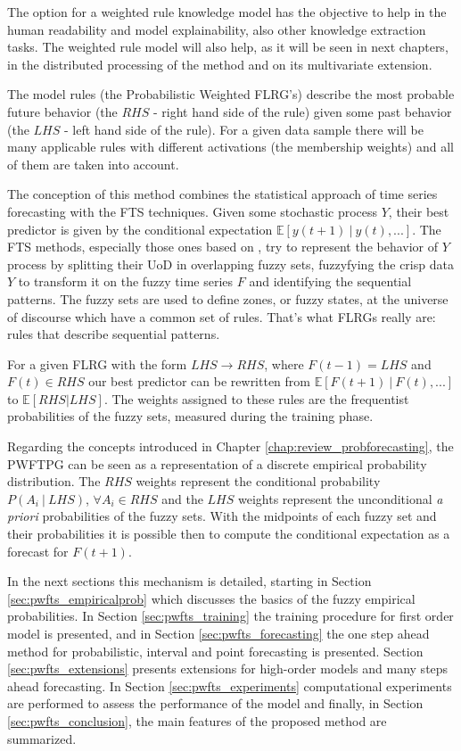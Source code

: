 The option for a weighted rule knowledge model has the objective to help in the human readability and model explainability, also other knowledge extraction tasks. The weighted rule model will also help, as it will be seen in next chapters, in the distributed processing of the method and on its multivariate extension.


The model rules (the Probabilistic Weighted FLRG's) describe the most probable future behavior (the $RHS$ - right hand side of the rule) given some past behavior (the $LHS$ - left hand side of the rule). For a given data sample there will be  many applicable rules with different activations (the membership weights) and all of them are taken into account.

The conception of this method combines the statistical approach of time series forecasting with the FTS techniques. Given some stochastic process $Y$, their best predictor is given by the conditional expectation $\mathbb{E}[y(t+1)\ |\ y(t),...]$. The FTS methods, especially those ones based on \cite{chen1996forecasting}, try to represent the behavior of $Y$ process by splitting their UoD in overlapping fuzzy sets, fuzzyfying the crisp data $Y$ to transform it on the fuzzy time series $F$ and identifying the sequential patterns.  The fuzzy sets are used to define zones, or fuzzy states, at the universe of discourse which have a common set of rules. That's what FLRGs really are: rules that describe sequential patterns. 

For a given FLRG with the form $LHS \rightarrow RHS$, where $F(t-1) = LHS$ and $F(t) \in RHS$ our best predictor can be rewritten from $\mathbb{E}[F(t+1)\ |\ F(t),...]$ to $\mathbb{E}[RHS|LHS]$.  The weights assigned to these rules are the frequentist probabilities of the fuzzy sets, measured during the training phase. 

Regarding the concepts introduced in Chapter \ref{chap:review_probforecasting}, the PWFTPG can be seen as a representation of a discrete empirical probability distribution.  The $RHS$ weights represent the conditional probability $P(A_i\ |\ LHS)$, $\forall A_i \in RHS$ and the $LHS$ weights represent the unconditional \textit{a priori} probabilities of the fuzzy sets. With the midpoints of each fuzzy set and their probabilities it is possible then to compute the conditional expectation as a forecast for $F(t+1)$.

In the next sections this mechanism is detailed, starting in Section \ref{sec:pwfts_empiricalprob} which discusses the basics of the fuzzy empirical probabilities. In Section \ref{sec:pwfts_training} the training procedure for first order model is presented, and in Section \ref{sec:pwfts_forecasting} the one step ahead method for probabilistic, interval and point forecasting is presented. Section \ref{sec:pwfts_extensions} presents extensions for high-order models and many steps ahead forecasting. In Section \ref{sec:pwfts_experiments} computational experiments are performed to assess the performance of the model and finally, in Section \ref{sec:pwfts_conclusion}, the main features of the proposed method are summarized.  


